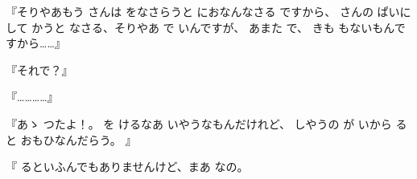 
『そりやあもう
さんは
をなさらうと
におなんなさる
ですから、
さんの
ぱいに
して
かうと
なさる、そりやあ
で
いんですが、
あまた
で、
きも
もないもんですから……』

『それで？』

『…………』

『あゝ
つたよ！。
を
けるなあ
いやうなもんだけれど、
しやうの
が
いから
ると
おもひなんだらう。
』

『
るといふんでもありませんけど、まあ
なの。

